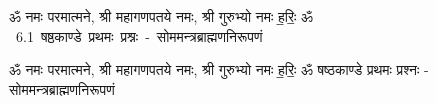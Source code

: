 \documentclass[17pt]{extarticle}
\begin{document}
\begin{titlepage}
    \begin{center}
 
\begin{sanskrit}
    { \Large
    ॐ नमः परमात्मने, श्री महागणपतये नमः, श्री गुरुभ्यो नमः
ह॒रिः॒ ॐ 
    }
    \\
    \vspace{2.5cm}
    \mbox{ \Huge
    6.1      षष्ठकाण्डे प्रथमः प्रश्नः - सोममन्त्रब्राह्मणनिरूपणं   }
\end{sanskrit}
\end{center}

\end{titlepage}
\tableofcontents

ॐ नमः परमात्मने, श्री महागणपतये नमः, श्री गुरुभ्यो नमः
ह॒रिः॒ ॐ       षष्ठकाण्डे प्रथमः प्रश्नः - सोममन्त्रब्राह्मणनिरूपणं \newline

\end{document}
